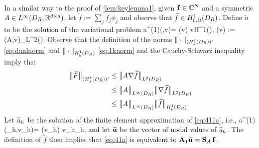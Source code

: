 \

In a similar way to the proof of \cref{lem:keylemma1}, given $\mathbf{f} \in \mathbb C^N$ and a symmetric $A\in L^\infty(D_{R}, \mathbb R^{d\times d})$, let $\widetilde{f} := \sum_j f_j \phi_j$ and observe that $\widetilde{f} \in \HozDDR$. Define $\widetilde{u}$ to be the solution of the variational problem 
\beq\label{eq:411a}
a^{(1)}(,v)= (v) \quad{} v\in H^1(\Omega),
\quad{} \quad
 (v) :=(A\nabla{},\nabla v)_{L^2(\Omega)}.
\eeq
Observe that the definition of the norms $\|\cdot\|_{(\HokDR)'}$ \cref{eq:dualnorm} and $\|\cdot\|_{\HokDR}$ \cref{eq:1knorm} and the Cauchy-Schwarz inequality imply that
\begin{align}
\big\| \widetilde{F}\big\|_{(\HokDR)'}&\leq \big\|A\nabla \widetilde{f}\big\|_{\LtDR}\nonumber\\
&\leq \big\|A\big\|_{L^\infty(\DR)} \big\|\nabla \widetilde{f}\big\|_{\LtDR}\label{eq:Fbounda}\\
&\leq \big\|A\big\|_{L^\infty(\DR)} \big\| \widetilde{f}\big\|_{\HokDR}.\label{eq:Fbound}
\end{align}
Let $\widetilde{u}_h$ be the solution of the finite element approximation of \cref{eq:411a}, i.e.,
\beq\label{eq:41a}
a^{(1)}(\tu_h,v_h)= (v_h) \quad{} v_h\in \cV_h,
\eeq
and let $\widetilde{\mathbf{u}}$ be the vector of nodal values of $\widetilde{u}_h$. The definition of $\widetilde{f}$ then implies that \cref{eq:41a} is equivalent to $\mathbf{A}_{1} \widetilde{\mathbf{u}} = \mathbf{S}_A\,\mathbf{f}$. 


